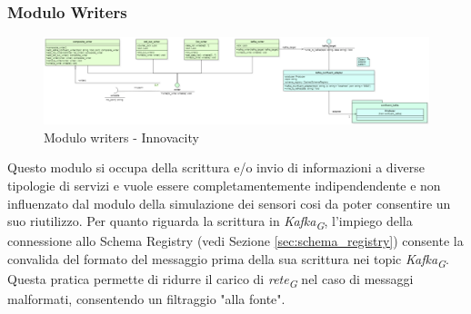 \subsubsection{Modulo Writers} \label{sec:writersModule}

\begin{figure}[H]
    \centering
    \includegraphics[width=1.1\textwidth]{../Images/SpecificaTecnica/writerModule.PNG}
    \caption{Modulo writers - Innovacity}
    \label{fig: writersModule}
\end{figure}

Questo modulo si occupa della scrittura e/o invio di informazioni a diverse tipologie di servizi e vuole essere completamentemente indipendendente e non influenzato dal modulo della simulazione dei sensori cosi da poter consentire un suo riutilizzo.
Per quanto riguarda la scrittura in \textit{Kafka}\textsubscript{\textit{G}}, l'impiego della connessione allo Schema Registry (vedi Sezione \ref{sec:schema_registry}) consente la convalida del formato del messaggio prima della sua scrittura nei topic \textit{Kafka}\textsubscript{\textit{G}}. Questa pratica permette di ridurre il carico di \textit{rete}\textsubscript{\textit{G}} nel caso di messaggi malformati, consentendo un filtraggio "alla fonte".

